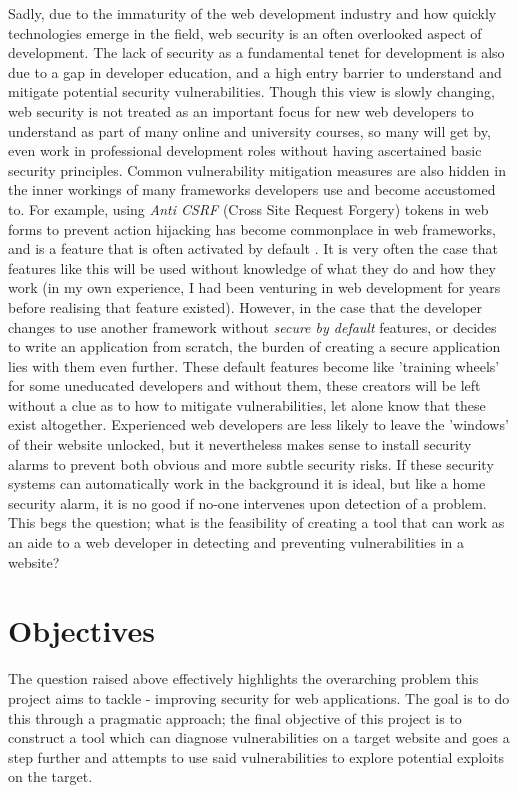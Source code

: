 Sadly, due to the immaturity of the web development industry and how quickly technologies emerge in the field, web security is an often overlooked aspect of development. 
The lack of security as a fundamental tenet for development is also due to a gap in developer education, and a high entry barrier to understand and mitigate potential security vulnerabilities. 
Though this view is slowly changing, web security is not treated as an important focus for new web developers to understand as part of many online and university courses, so many will get by, even work in professional development roles without having ascertained basic security principles. 
Common vulnerability mitigation measures are also hidden in the inner workings of many frameworks developers use and become accustomed to. 
For example, using \textit{Anti CSRF} (Cross Site Request Forgery) tokens in web forms to prevent action hijacking has become commonplace in web frameworks, and is a feature that is often activated by default \cite{djangoCSRF, rubyOnRailsCSRF, laravelCSRF}.
It is very often the case that features like this will be used without knowledge of what they do and how they work (in my own experience, I had been venturing in web development for years before realising that feature existed). 
However, in the case that the developer changes to use another framework without \textit{secure by default} features, or decides to write an application from scratch, the burden of creating a secure application lies with them even further. 
These default features become like 'training wheels' for some uneducated developers and without them, these creators will be left without a clue as to how to mitigate vulnerabilities, let alone know that these exist altogether. 
Experienced web developers are less likely to leave the 'windows' of their website unlocked, but it nevertheless makes sense to install security alarms to prevent both obvious and more subtle security risks.
If these security systems can automatically work in the background it is ideal, but like a home security alarm, it is no good if no-one intervenes upon detection of a problem. 
This begs the question; what is the feasibility of creating a tool that can work as an aide to a web developer in detecting and preventing vulnerabilities in a website? \\

\section{Objectives}
The question raised above effectively highlights the overarching problem this project aims to tackle - improving security for web applications. The goal is to do this through a pragmatic approach; the final objective of this project is to construct a tool which can diagnose vulnerabilities on a target website and goes a step further and attempts to use said vulnerabilities to explore potential exploits on the target. \\


